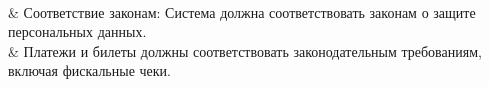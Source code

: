 {\begin{xltabular}{\linewidth}
         \\
        \hline

        \ReqID & Соответствие законам: Система должна соответствовать законам о
        защите персональных данных. \\
        \hline
        \ReqID & Платежи и билеты должны соответствовать
        законодательным требованиям, включая фискальные чеки. \\
        \hline
    \end{xltabular}
}
